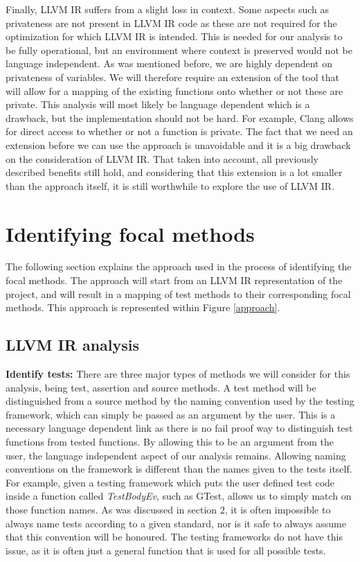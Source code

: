 \documentclass[11pt]{article}
\begin{document}
\begin{multicols}{2}
Finally, LLVM IR suffers from a slight loss in context. Some aspects such as privateness are not present in LLVM IR code as these are not required for the optimization for which LLVM IR is intended. This is needed for our analysis to be fully operational, but an environment where context is preserved would not be language independent. As was mentioned before, we are highly dependent on privateness of variables. We will therefore require an extension of the tool that will allow for a mapping of the existing functions onto whether or not these are private. This analysis will most likely be language dependent which is a drawback, but the implementation should not be hard. For example, Clang \cite{lattner2008llvm} allows for direct access to whether or not a function is private. The fact that we need an extension before we can use the approach is unavoidable and it is a big drawback on the consideration of LLVM IR. That taken into account, all previously described benefits still hold, and considering that this extension is a lot smaller than the approach itself, it is still worthwhile to explore the use of LLVM IR.

\section{Identifying focal methods}
The following section explains the approach used in the process of identifying the focal methods. The approach will start from an LLVM IR representation of the project, and will result in a mapping of test methods to their corresponding focal methods. This approach is represented within Figure \ref{approach}.

\subsection{LLVM IR analysis}
\textbf{Identify tests:} There are three major types of methods we will consider for this analysis, being test, assertion and source methods. A test method will be distinguished from a source method by the naming convention used by the testing framework, which can simply be passed as an argument by the user. This is a necessary language dependent link as there is no fail proof way to distinguish test functions from tested functions. By allowing this to be an argument from the user, the language independent aspect of our analysis remains. Allowing naming conventions on the framework is different than the names given to the tests itself. For example, given a testing framework which puts the user defined test code inside a function called \textit{TestBodyEv}, such as GTest, allows us to simply match on those function names. As was discussed in section 2, it is often impossible to always name tests according to a given standard, nor is it safe to always assume that this convention will be honoured. The testing frameworks do not have this issue, as it is often just a general function that is used for all possible tests.


\end{multicols}
\end{document}
